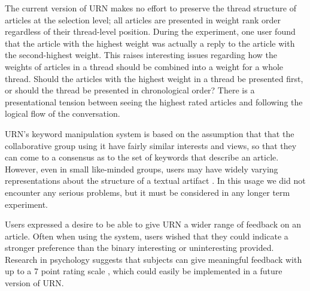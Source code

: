 The current version of URN makes no effort to preserve the thread structure
of articles at the selection level; all articles are presented in weight
rank order regardless of their thread-level position. During the
experiment, one user found that the article with the highest weight was
actually a reply to the article with the second-highest weight. This raises
interesting issues regarding how the weights of articles in a thread should
be combined into a weight for a whole thread. Should the articles with the
highest weight in a thread be presented first, or should the thread be
presented in chronological order? There is a presentational tension between
seeing the highest rated articles and following the logical flow of the
conversation.

URN's keyword manipulation system is based on the assumption that that the
collaborative group using it have fairly similar interests and views, so
that they can come to a consensus as to the set of keywords that describe
an article. However, even in small like-minded groups, users may have
widely varying representations about the structure of a textual artifact
\cite{csdl-93-14}. In this usage we did not encounter any serious
problems, but it must be considered in any longer term experiment.

Users expressed a desire to be able to give URN a wider range of feedback
on an article. Often when using the system, users wished that they could
indicate a stronger preference than the binary interesting or uninteresting
provided. Research in psychology suggests that subjects can give meaningful
feedback with up to a 7 point rating scale \cite{magic7}, which could
easily be implemented in a future version of URN.




